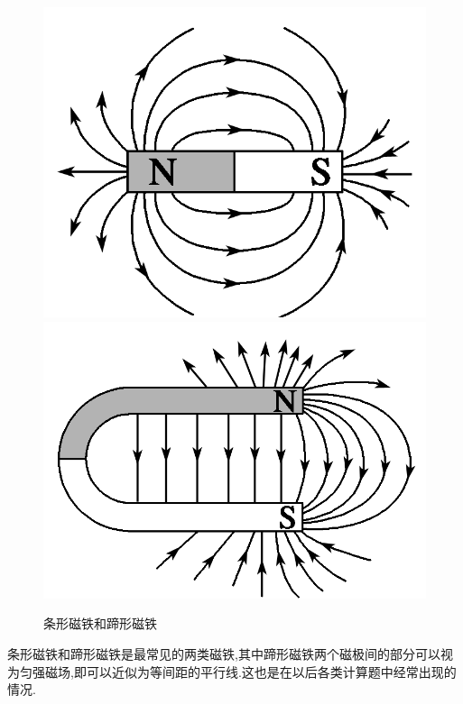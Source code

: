 \begin{figure}[H]
  \centering
  \includegraphics{./cichang/图片1.png}
  \qquad
  \includegraphics{./cichang/图片2.png}
  \caption{条形磁铁和蹄形磁铁}
\end{figure}
条形磁铁和蹄形磁铁是最常见的两类磁铁,其中蹄形磁铁两个磁极间的部分可以视为匀强磁场,即可以近似为等间距的平行线.这也是在以后各类计算题中经常出现的情况.


